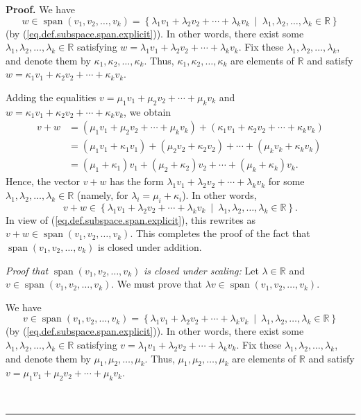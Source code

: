 \documentclass[numbers=enddot,12pt,final,onecolumn,notitlepage]{scrartcl}%
\theoremstyle{definition}
\newenvironment{proof}[1][Proof]{\noindent\textbf{#1.} }{\ \rule{0.5em}{0.5em}}
\begin{document}
\begin{proof}
We have
\[
w\in\operatorname{span}\left(  v_{1},v_{2},\ldots,v_{k}\right)  =\left\{
\lambda_{1}v_{1}+\lambda_{2}v_{2}+\cdots+\lambda_{k}v_{k}\ \mid\ \lambda
_{1},\lambda_{2},\ldots,\lambda_{k}\in\mathbb{R}\right\}
\]
(by (\ref{eq.def.subspace.span.explicit})). In other words, there exist some
$\lambda_{1},\lambda_{2},\ldots,\lambda_{k}\in\mathbb{R}$ satisfying
$w=\lambda_{1}v_{1}+\lambda_{2}v_{2}+\cdots+\lambda_{k}v_{k}$. Fix these
$\lambda_{1},\lambda_{2},\ldots,\lambda_{k}$, and denote them by $\kappa
_{1},\kappa_{2},\ldots,\kappa_{k}$. Thus, $\kappa_{1},\kappa_{2},\ldots
,\kappa_{k}$ are elements of $\mathbb{R}$ and satisfy $w=\kappa_{1}%
v_{1}+\kappa_{2}v_{2}+\cdots+\kappa_{k}v_{k}$.

Adding the equalities $v=\mu_{1}v_{1}+\mu_{2}v_{2}+\cdots+\mu_{k}v_{k}$ and
$w=\kappa_{1}v_{1}+\kappa_{2}v_{2}+\cdots+\kappa_{k}v_{k}$, we obtain%
\begin{align*}
v+w  &  =\left(  \mu_{1}v_{1}+\mu_{2}v_{2}+\cdots+\mu_{k}v_{k}\right)
+\left(  \kappa_{1}v_{1}+\kappa_{2}v_{2}+\cdots+\kappa_{k}v_{k}\right) \\
&  =\left(  \mu_{1}v_{1}+\kappa_{1}v_{1}\right)  +\left(  \mu_{2}v_{2}%
+\kappa_{2}v_{2}\right)  +\cdots+\left(  \mu_{k}v_{k}+\kappa_{k}v_{k}\right)
\\
&  =\left(  \mu_{1}+\kappa_{1}\right)  v_{1}+\left(  \mu_{2}+\kappa
_{2}\right)  v_{2}+\cdots+\left(  \mu_{k}+\kappa_{k}\right)  v_{k}.
\end{align*}
Hence, the vector $v+w$ has the form $\lambda_{1}v_{1}+\lambda_{2}v_{2}%
+\cdots+\lambda_{k}v_{k}$ for some $\lambda_{1},\lambda_{2},\ldots,\lambda
_{k}\in\mathbb{R}$ (namely, for $\lambda_{i}=\mu_{i}+\kappa_{i}$). In other
words,
\[
v+w\in\left\{  \lambda_{1}v_{1}+\lambda_{2}v_{2}+\cdots+\lambda_{k}v_{k}%
\ \mid\ \lambda_{1},\lambda_{2},\ldots,\lambda_{k}\in\mathbb{R}\right\}  .
\]
In view of (\ref{eq.def.subspace.span.explicit}), this rewrites as
$v+w\in\operatorname{span}\left(  v_{1},v_{2},\ldots,v_{k}\right)  $. This
completes the proof of the fact that $\operatorname{span}\left(  v_{1}%
,v_{2},\ldots,v_{k}\right)  $ is closed under addition.

\textit{Proof that }$\operatorname{span}\left(  v_{1},v_{2},\ldots
,v_{k}\right)  $ \textit{is closed under scaling:} Let $\lambda\in\mathbb{R}$
and $v\in\operatorname{span}\left(  v_{1},v_{2},\ldots,v_{k}\right)  $. We
must prove that $\lambda v\in\operatorname{span}\left(  v_{1},v_{2}%
,\ldots,v_{k}\right)  $.

We have
\[
v\in\operatorname{span}\left(  v_{1},v_{2},\ldots,v_{k}\right)  =\left\{
\lambda_{1}v_{1}+\lambda_{2}v_{2}+\cdots+\lambda_{k}v_{k}\ \mid\ \lambda
_{1},\lambda_{2},\ldots,\lambda_{k}\in\mathbb{R}\right\}
\]
(by (\ref{eq.def.subspace.span.explicit})). In other words, there exist some
$\lambda_{1},\lambda_{2},\ldots,\lambda_{k}\in\mathbb{R}$ satisfying
$v=\lambda_{1}v_{1}+\lambda_{2}v_{2}+\cdots+\lambda_{k}v_{k}$. Fix these
$\lambda_{1},\lambda_{2},\ldots,\lambda_{k}$, and denote them by $\mu_{1}%
,\mu_{2},\ldots,\mu_{k}$. Thus, $\mu_{1},\mu_{2},\ldots,\mu_{k}$ are elements
of $\mathbb{R}$ and satisfy $v=\mu_{1}v_{1}+\mu_{2}v_{2}+\cdots+\mu_{k}v_{k}$.


\end{proof}
\end{document}
